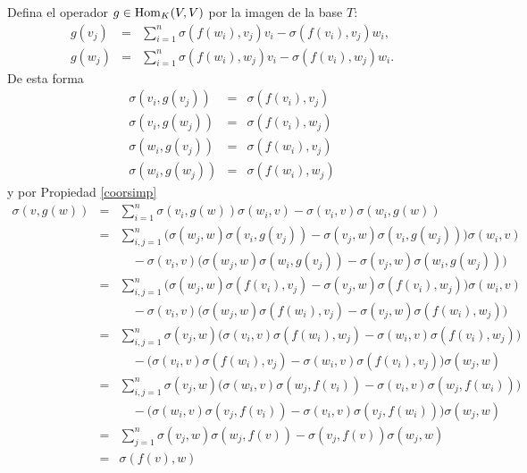 \dem Defina el operador $g\in\operatorname{Hom}_{K}(V,V)$ por la imagen de la base $T$:
\begin{eqnarray*}
g(v_j) & = & \sum_{i=1}^n\sigma(f(w_i),v_j)v_i-\sigma(f(v_i),v_j)w_i,\\
g(w_j) & = & \sum_{i=1}^n\sigma(f(w_i),w_j)v_i-\sigma(f(v_i),w_j)w_i.
\end{eqnarray*}
De esta forma
\begin{eqnarray*}
\sigma\left(v_i,g(v_j)\right) & = & \sigma\left(f(v_i),v_j\right)\\
\sigma\left(v_i,g(w_j)\right) & = & \sigma\left(f(v_i),w_j\right)\\
\sigma\left(w_i,g(v_j)\right) & = &  \sigma\left(f(w_i),v_j\right)\\
 \sigma\left(w_i,g(w_j)\right) & = & \sigma\left(f(w_i),w_j\right)
\end{eqnarray*}
y por Propiedad \ref{coorsimp}
\begin{eqnarray*}
\sigma\left(v,g(w)\right) & = & \sum_{i=1}^n \sigma\left(v_i,g(w)\right)\sigma\left(w_i,v\right)-\sigma\left(v_i,v\right)\sigma\left(w_i,g(w)\right)\\
 & = & \sum_{i,j=1}^n \Big(\sigma\left(w_j,w\right)\sigma\left(v_i,g(v_j)\right)-\sigma\left(v_j,w\right)\sigma\left(v_i,g(w_j)\right)\Big)\sigma\left(w_i,v\right)\\
 & & \quad-\sigma\left(v_i,v\right)\Big(\sigma\left(w_j,w\right)\sigma\left(w_i,g(v_j)\right)-\sigma\left(v_j,w\right)\sigma\left(w_i,g(w_j)\right)\Big)\\
  & = & \sum_{i,j=1}^n \Big(\sigma\left(w_j,w\right)\sigma\left(f(v_i),v_j\right)-\sigma\left(v_j,w\right)\sigma\left(f(v_i),w_j\right)\Big)\sigma\left(w_i,v\right)\\
 & & \quad-\sigma\left(v_i,v\right)\Big(\sigma\left(w_j,w\right)\sigma\left(f(w_i),v_j\right)-\sigma\left(v_j,w\right)\sigma\left(f(w_i),w_j\right)\Big)\\
  & = & \sum_{i,j=1}^n \sigma\left(v_j,w\right)\Big(\sigma\left(v_i,v\right)\sigma\left(f(w_i),w_j\right)-\sigma\left(w_i,v\right)\sigma\left(f(v_i),w_j\right)\Big)\\
 & & \quad-\Big(\sigma\left(v_i,v\right)\sigma\left(f(w_i),v_j\right)-\sigma\left(w_i,v\right)\sigma\left(f(v_i),v_j\right)\Big)\sigma\left(w_j,w\right)\\
  & = & \sum_{i,j=1}^n \sigma\left(v_j,w\right)\Big(\sigma\left(w_i,v\right)\sigma\left(w_j,f(v_i)\right)-\sigma\left(v_i,v\right)\sigma\left(w_j,f(w_i)\right)\Big)\\
 & & \quad-\Big(\sigma\left(w_i,v\right)\sigma\left(v_j,f(v_i)\right)-\sigma\left(v_i,v\right)\sigma\left(v_j,f(w_i)\right)\Big)\sigma\left(w_j,w\right)\\
 & = & \sum_{j=1}^n \sigma\left(v_j,w\right)\sigma\left(w_j,f(v)\right)-\sigma\left(v_j,f(v)\right)\sigma\left(w_j,w\right)\\
 & = & \sigma\left(f(v),w\right)
\end{eqnarray*}
